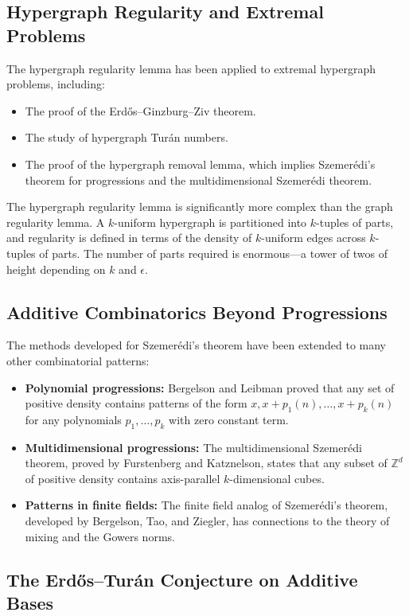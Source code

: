 \subsection{Hypergraph Regularity and Extremal Problems}

The hypergraph regularity lemma has been applied to extremal hypergraph problems, including:
\begin{itemize}
\item The proof of the Erd\H{o}s--Ginzburg--Ziv theorem.
\item The study of hypergraph Tur\'an numbers.
\item The proof of the hypergraph removal lemma, which implies Szemer\'edi's theorem for progressions and the multidimensional Szemer\'edi theorem.
\end{itemize}

The hypergraph regularity lemma is significantly more complex than the graph regularity lemma. A $k$-uniform hypergraph is partitioned into $k$-tuples of parts, and regularity is defined in terms of the density of $k$-uniform edges across $k$-tuples of parts. The number of parts required is enormous---a tower of twos of height depending on $k$ and $\epsilon$.

\subsection{Additive Combinatorics Beyond Progressions}

The methods developed for Szemer\'edi's theorem have been extended to many other combinatorial patterns:
\begin{itemize}
\item \textbf{Polynomial progressions:} Bergelson and Leibman proved that any set of positive density contains patterns of the form $x, x+p_1(n), \ldots, x+p_k(n)$ for any polynomials $p_1,\ldots,p_k$ with zero constant term.
\item \textbf{Multidimensional progressions:} The multidimensional Szemer\'edi theorem, proved by Furstenberg and Katznelson, states that any subset of $\mathbb{Z}^d$ of positive density contains axis-parallel $k$-dimensional cubes.
\item \textbf{Patterns in finite fields:} The finite field analog of Szemer\'edi's theorem, developed by Bergelson, Tao, and Ziegler, has connections to the theory of mixing and the Gowers norms.
\end{itemize}

\subsection{The Erd\H{o}s--Tur\'an Conjecture on Additive Bases}

